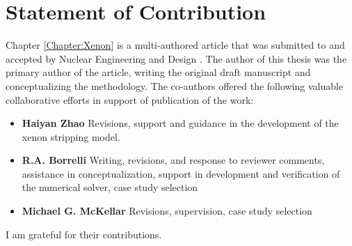 \chapter{Statement of Contribution}
Chapter \ref{Chapter:Xenon} is a multi-authored article that was submitted to and accepted by Nuclear Engineering and Design \cite{RootXe}. The author of this thesis was the primary author of the article, writing the original draft manuscript and conceptualizing the methodology. The co-authors offered the following valuable collaborative efforts in support of publication of the work: 
\begin{itemize}
	\item \textbf{Haiyan Zhao} Revisions, support and guidance in the development of the xenon stripping model.
	\item \textbf{R.A. Borrelli} Writing, revisions, and response to reviewer comments, assistance in conceptualization, support in development and verification of the numerical solver, case study selection 
	\item \textbf{Michael G. McKellar} Revisions, supervision, case study selection
\end{itemize}

I am grateful for their contributions.